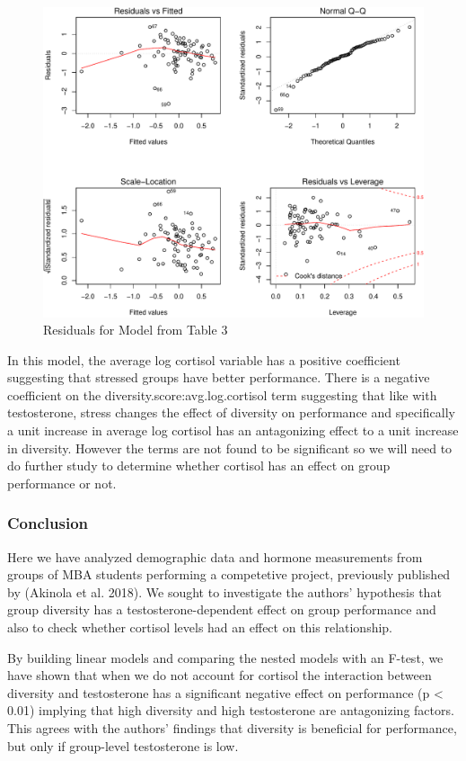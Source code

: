 \documentclass[]{article}
\begin{document}
\begin{figure}
\centering
\includegraphics{19_10_27_hw7_q1_files/figure-latex/unnamed-chunk-6-1.pdf}
\caption{\label{fig:y} Residuals for Model from Table 3}
\end{figure}

In this model, the average log cortisol variable has a positive
coefficient suggesting that stressed groups have better performance.
There is a negative coefficient on the diversity.score:avg.log.cortisol
term suggesting that like with testosterone, stress changes the effect
of diversity on performance and specifically a unit increase in average
log cortisol has an antagonizing effect to a unit increase in diversity.
However the terms are not found to be significant so we will need to do
further study to determine whether cortisol has an effect on group
performance or not.

\subsubsection{Conclusion}\label{conclusion}

Here we have analyzed demographic data and hormone measurements from
groups of MBA students performing a competetive project, previously
published by (Akinola et al. 2018). We sought to investigate the
authors' hypothesis that group diversity has a testosterone-dependent
effect on group performance and also to check whether cortisol levels
had an effect on this relationship.

By building linear models and comparing the nested models with an
F-test, we have shown that when we do not account for cortisol the
interaction between diversity and testosterone has a significant
negative effect on performance (p \textless{} 0.01) implying that high
diversity and high testosterone are antagonizing factors. This agrees
with the authors' findings that diversity is beneficial for performance,
but only if group-level testosterone is low.
\end{document}

